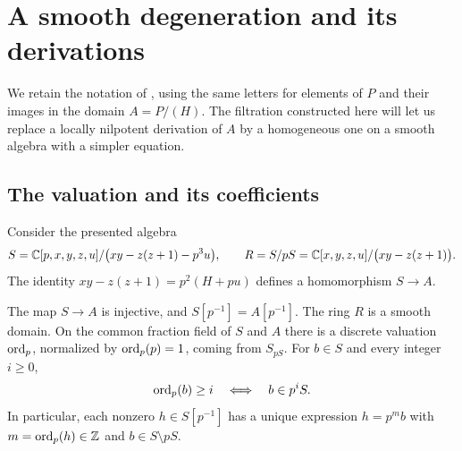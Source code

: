 \section{A smooth degeneration and its derivations}
\label{sec:degeneration}

We retain the notation of , using the same letters
for elements of $P$ and their images in the domain $A=P/(H)$.  The
filtration constructed here will let us replace a locally nilpotent
derivation of $A$ by a homogeneous one on a smooth algebra with a simpler
equation.

\subsection{The valuation and its coefficients}

Consider the presented algebra
\begin{equation}\label{deg:S-R}
 S=\mathbb C[p,x,y,z,u]/\bigl(xy-z(z+1)-p^3u\bigr),
 \qquad
 R=S/pS=\mathbb C[x,y,z,u]/\bigl(xy-z(z+1)\bigr).
\end{equation}
The identity $xy-z(z+1)=p^2(H+pu)$ defines a homomorphism $S\to A$.

\begin{lemma}\label{deg:valuation}
The map $S\to A$ is injective, and
$S[p^{-1}]=A[p^{-1}]$.  The ring $R$ is a smooth domain.
On the common fraction field of $S$ and $A$ there is a discrete valuation
$\operatorname{ord}_p$, normalized by $\operatorname{ord}_p(p)=1$, coming from $S_{pS}$.
For $b\in S$ and every integer $i\geq 0$,
\begin{equation}\label{deg:global-divisibility}
 \operatorname{ord}_p(b)\geq i \quad\Longleftrightarrow\quad b\in p^iS.
\end{equation}
In particular, each nonzero $h\in S[p^{-1}]$ has a unique expression
$h=p^m b$ with $m=\operatorname{ord}_p(h)\in\mathbb Z$ and $b\in S\setminus pS$.
\end{lemma}

